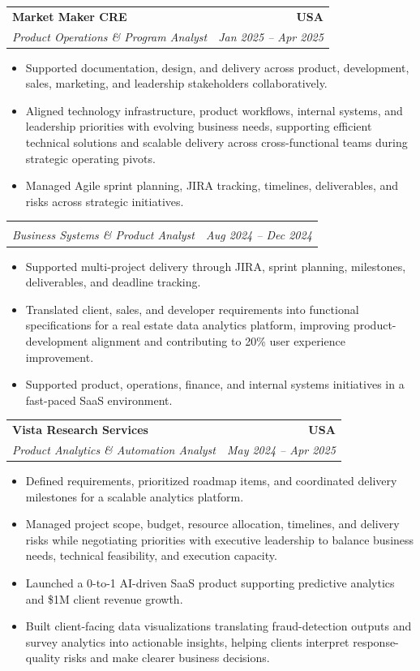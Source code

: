 \documentclass[letterpaper,10pt]{article}
\makeatletter
\newcommand{\resumeItem}[1]{\item \small{#1}}
\newcommand{\resumeSubheading}[4]{
  \vspace{1pt}\item
    \begin{tabular*}{1.0\textwidth}[t]{l@{\extracolsep{\fill}}r}
      \textbf{#1} & \textbf{\small #2} \\
      \textit{\small #3} & \textit{\small #4} \\
    \end{tabular*}\vspace{-6pt}
}
\newcommand{\resumeItemListStart}{\begin{itemize}[leftmargin=0.15in, itemsep=1pt, topsep=3pt]}
\newcommand{\resumeItemListEnd}{\end{itemize}\vspace{-2pt}}
\makeatother
\begin{document}
\vspace{-2pt}

\resumeSubheading
{Market Maker CRE}{USA}
{Product Operations \& Program Analyst}{Jan 2025 -- Apr 2025}
\resumeItemListStart
\resumeItem{Supported documentation, design, and delivery across product, development, sales, marketing, and leadership stakeholders collaboratively.}
\resumeItem{Aligned technology infrastructure, product workflows, internal systems, and leadership priorities with evolving business needs, supporting efficient technical solutions and scalable delivery across cross-functional teams during strategic operating pivots.}
\resumeItem{Managed Agile sprint planning, JIRA tracking, timelines, deliverables, and risks across strategic initiatives.}
\resumeItemListEnd

\vspace{-2pt}

\resumeSubheading
{}{}
{Business Systems \& Product Analyst}{Aug 2024 -- Dec 2024}
\resumeItemListStart
\resumeItem{Supported multi-project delivery through JIRA, sprint planning, milestones, deliverables, and deadline tracking.}
\resumeItem{Translated client, sales, and developer requirements into functional specifications for a real estate data analytics platform, improving product-development alignment and contributing to 20\% user experience improvement.}
\resumeItem{Supported product, operations, finance, and internal systems initiatives in a fast-paced SaaS environment.}
\resumeItemListEnd

\vspace{-2pt}

\resumeSubheading
{Vista Research Services}{USA}
{Product Analytics \& Automation Analyst}{May 2024 -- Apr 2025}
\resumeItemListStart
\resumeItem{Defined requirements, prioritized roadmap items, and coordinated delivery milestones for a scalable analytics platform.}
\resumeItem{Managed project scope, budget, resource allocation, timelines, and delivery risks while negotiating priorities with executive leadership to balance business needs, technical feasibility, and execution capacity.}
\resumeItem{Launched a 0-to-1 AI-driven SaaS product supporting predictive analytics and \$1M client revenue growth.}
\resumeItem{Built client-facing data visualizations translating fraud-detection outputs and survey analytics into actionable insights, helping clients interpret response-quality risks and make clearer business decisions.}
\resumeItemListEnd

\vspace{-2pt}
\end{document}
